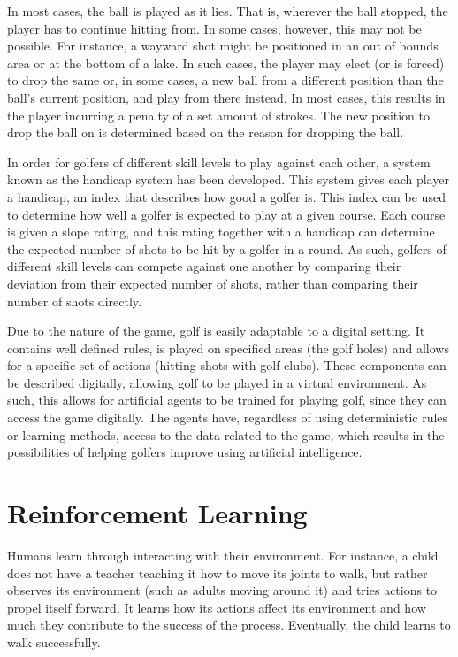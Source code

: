 \documentclass{kththesis}
\begin{document}
In most cases, the ball is played as it lies. That is, wherever the ball stopped, the player has to continue hitting from. In some cases, however, this may not be possible. For instance, a wayward shot might be positioned in an out of bounds area or at the bottom of a lake. In such cases, the player may elect (or is forced) to drop the same or, in some cases, a new ball from a different position than the ball's current position, and play from there instead. In most cases, this results in the player incurring a penalty of a set amount of strokes. The new position to drop the ball on is determined based on the reason for dropping the ball. 

In order for golfers of different skill levels to play against each other, a system known as the handicap system has been developed. This system gives each player a handicap, an index that describes how good a golfer is. This index can be used to determine how well a golfer is expected to play at a given course. Each course is given a slope rating, and this rating together with a handicap can determine the expected number of shots to be hit by a golfer in a round. As such, golfers of different skill levels can compete against one another by comparing their deviation from their expected number of shots, rather than comparing their number of shots directly.

Due to the nature of the game, golf is easily adaptable to a digital setting. It contains well defined rules, is played on specified areas (the golf holes) and allows for a specific set of actions (hitting shots with golf clubs). These components can be described digitally, allowing golf to be played in a virtual environment. As such, this allows for artificial agents to be trained for playing golf, since they can access the game digitally. The agents have, regardless of using deterministic rules or learning methods, access to the data related to the game, which results in the possibilities of helping golfers improve using artificial intelligence.

\section{Reinforcement Learning}
\label{sec:reinforcementlearning}
Humans learn through interacting with their environment. For instance, a child does not have a teacher teaching it how to move its joints to walk, but rather observes its environment (such as adults moving around it) and tries actions to propel itself forward. It learns how its actions affect its environment and how much they contribute to the success of the process. Eventually, the child learns to walk successfully. 
\end{document}
